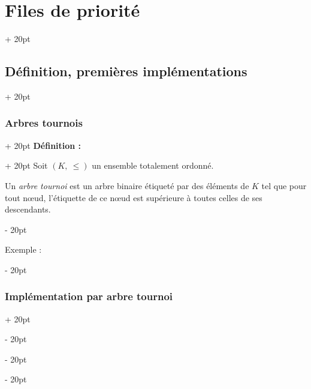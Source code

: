 \documentclass[a4paper, 12pt, twoside]{article}
\renewcommand{\le}{\leqslant}
\newcommand{\ind}[1][20pt]{\advance\leftskip + #1}
\newcommand{\deind}[1][20pt]{\advance\leftskip - #1}
\newenvironment{indt}[2][20pt]{#2 \par \ind[#1]}{\par \deind} %
\begin{document}
\begin{indt}{\section{Files de priorité}}
\begin{indt}{\subsection{Définition, premières implémentations}}
            \vspace{12pt}
            
            \begin{indt}{\subsubsection{Arbres tournois}}
                \begin{indt}{\textbf{Définition :}}
                    Soit $(K,\ \le)$ un ensemble totalement ordonné.
                    
                    Un \textit{arbre tournoi} est un arbre binaire étiqueté par des éléments de $K$ tel que pour tout n\oe ud, l'étiquette de ce n\oe ud est supérieure à toutes celles de ses descendants.
                \end{indt}
                
                \vspace{12pt}
                
                Exemple :
                \begin{center}
                \end{center}
            \end{indt}
            
            \vspace{12pt}
            
            \begin{indt}{\subsubsection{Implémentation par arbre tournoi}}
                \label{3.1.6}
                

\end{indt}
\end{indt}
\end{indt}
\end{document}
